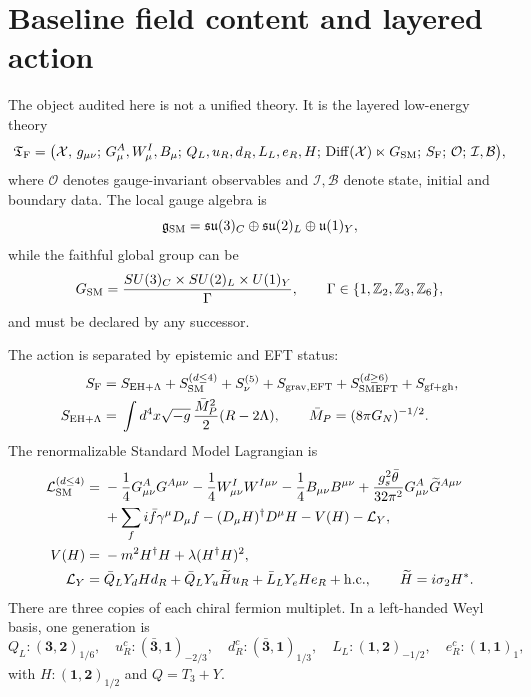 \section{Baseline field content and layered action}\label{sec:action}
The object audited here is not a unified theory. It is the layered low-energy theory
\begin{equation}
\mathfrak T_{\rm F}=\bigl(\mathcal X,\,g_{\mu\nu};\,G^A_\mu,W^I_\mu,B_\mu;\,Q_L,u_R,d_R,L_L,e_R,H;\,\mathrm{Diff}(\mathcal X)\ltimes G_{\rm SM};\,S_{\rm F};\,\mathcal O;\,\mathcal I,\mathcal B\bigr),
\end{equation}
where $\mathcal O$ denotes gauge-invariant observables and $\mathcal I,\mathcal B$ denote state, initial and boundary data.  The local gauge algebra is
\begin{equation}
\mathfrak g_{\rm SM}=\mathfrak{su}(3)_C\oplus\mathfrak{su}(2)_L\oplus\mathfrak u(1)_Y,
\end{equation}
while the faithful global group can be
\begin{equation}
G_{\rm SM}=\frac{SU(3)_C\times SU(2)_L\times U(1)_Y}{\Gamma},\qquad
\Gamma\in\{1,\mathbb Z_2,\mathbb Z_3,\mathbb Z_6\},
\end{equation}
and must be declared by any successor.

The action is separated by epistemic and EFT status:
\begin{align}
S_{\rm F}={}&S_{\rm EH+\Lambda}+S_{\rm SM}^{(d\le4)}+S_{\nu}^{(5)}+S_{\rm grav,EFT}+S_{\rm SMEFT}^{(d\ge6)}+S_{\rm gf+gh},\\
S_{\rm EH+\Lambda}={}&\int d^4x\sqrt{-g}\,\frac{\bar M_P^2}{2}(R-2\Lambda),\qquad \bar M_P=(8\pi G_N)^{-1/2}.
\end{align}
The renormalizable Standard Model Lagrangian is
\begin{align}
\mathcal L_{\rm SM}^{(d\le4)}={}&-\frac14G^A_{\mu\nu}G^{A\mu\nu}-\frac14W^I_{\mu\nu}W^{I\mu\nu}-\frac14B_{\mu\nu}B^{\mu\nu}
+\frac{g_s^2\bar\theta}{32\pi^2}G^A_{\mu\nu}\widetilde G^{A\mu\nu}\\
&+\sum_{f}i\bar f\gamma^\mu D_\mu f-(D_\mu H)^\dagger D^\mu H-V(H)-\mathcal L_Y,\\
V(H)={}&-m^2H^\dagger H+\lambda(H^\dagger H)^2,\\
\mathcal L_Y={}&\bar Q_LY_dHd_R+\bar Q_LY_u\widetilde H u_R+\bar L_LY_eHe_R+\mathrm{h.c.},\qquad \widetilde H=i\sigma_2H^*.
\end{align}
There are three copies of each chiral fermion multiplet.  In a left-handed Weyl basis, one generation is
\begin{equation}
Q_L:(\mathbf3,\mathbf2)_{1/6},\quad u_R^c:(\bar{\mathbf3},\mathbf1)_{-2/3},\quad d_R^c:(\bar{\mathbf3},\mathbf1)_{1/3},\quad L_L:(\mathbf1,\mathbf2)_{-1/2},\quad e_R^c:(\mathbf1,\mathbf1)_1,
\end{equation}
with $H:(\mathbf1,\mathbf2)_{1/2}$ and $Q=T_3+Y$.


